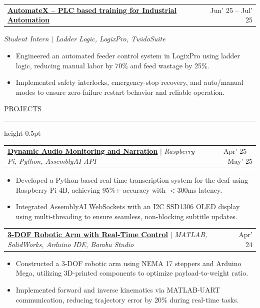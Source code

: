 \documentclass[10pt,a4paper]{article}
\newcommand{\resumeheading}[1]{
    \vspace{6pt}
    {\large\color{resblue} #1}
    \vspace{1pt}
    {\color{resblue}\hrule height 0.5pt}
    \vspace{4pt}
}
\begin{document}
\begin{tabularx}{\textwidth}{@{}X r@{}}
\textbf{\color{resblue} \href{https://drive.google.com/file/d/1PUqcvq8SkgS4APbpqYSwzsYsXNxvOywR/view?usp=drive_link}{AutomateX -- PLC based training for Industrial Automation}} & Jun' 25 -- Jul' 25
\end{tabularx}
\textit{Student Intern $|$ Ladder Logic, LogixPro, TwidoSuite}
\begin{itemize}[leftmargin=1.5em, itemsep=0pt, parsep=1pt, topsep=2pt]
    \item Engineered an automated feeder control system in LogixPro using ladder logic, reducing manual labor by 70\% and feed wastage by 25\%.
    \item Implemented safety interlocks, emergency-stop recovery, and auto/manual modes to ensure zero-failure restart behavior and reliable operation.
\end{itemize}

\resumeheading{PROJECTS}

\begin{tabularx}{\textwidth}{@{}X r@{}}
\textbf{\color{resblue} \href{https://github.com/som-anshu/damn}{Dynamic Audio Monitoring and Narration}} $|$ \textit{Raspberry Pi, Python, AssemblyAI API} & Apr' 25 -- May' 25
\end{tabularx}
\begin{itemize}[leftmargin=1.5em, itemsep=0pt, parsep=1pt, topsep=2pt]
    \item Developed a Python-based real-time transcription system for the deaf using Raspberry Pi 4B, achieving 95\%+ accuracy with $<$300ms latency.
    \item Integrated AssemblyAI WebSockets with an I2C SSD1306 OLED display using multi-threading to ensure seamless, non-blocking subtitle updates.
\end{itemize}

\vspace{2pt}

\begin{tabularx}{\textwidth}{@{}X r@{}}
\textbf{\color{resblue} \href{https://github.com/som-anshu/MATLAB-controlled-robotic-manipulator}{3-DOF Robotic Arm with Real-Time Control}} $|$ \textit{MATLAB, SolidWorks, Arduino IDE, Bambu Studio} & Apr' 24
\end{tabularx}
\begin{itemize}[leftmargin=1.5em, itemsep=0pt, parsep=1pt, topsep=2pt]
    \item Constructed a 3-DOF robotic arm using NEMA 17 steppers and Arduino Mega, utilizing 3D-printed components to optimize payload-to-weight ratio.
    \item Implemented forward and inverse kinematics via MATLAB-UART communication, reducing trajectory error by 20\% during real-time tasks.
\end{itemize}
\end{document}
